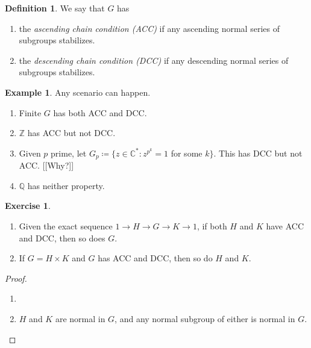 \documentclass[10pt,letterpaper,cm]{nupset}
\theoremstyle{definition}
\newtheorem*{definition}{Definition}
\newtheorem{exmp}{Example}
\newtheorem{exercise}{Exercise}
\newcommand{\C}{\mathbb C}
\newcommand{\Q}{\mathbb Q}
\newcommand{\Z}{\mathbb Z}
\newcommand{\1}{\mathbf{1}}
\newcommand{\0}{\vec 0}
\begin{document}
\begin{definition} We say that $G$ has
\begin{enumerate}
\item the \textit{ascending chain condition (ACC)} if any ascending normal series of subgroups stabilizes.
\item the \textit{descending chain condition (DCC)} if any descending normal series of subgroups stabilizes.
\end{enumerate}
\end{definition}

\begin{exmp} Any scenario can happen.
\begin{enumerate}
\item Finite $G$ has both ACC and DCC.
\item $\Z$ has ACC but not DCC.
\item Given $p$ prime, let $G_p \coloneqq  \{z\in \C^{\ast} : z^{p^k} =1$ for some $k \}$. This has DCC but not ACC. {[[Why?]]}
\item $\Q$ has neither property.
\end{enumerate}
\end{exmp}

\begin{exercise} $ $
\begin{enumerate}
\item Given the exact sequence $1 \to H \to G \to K \to 1$, if both $H$ and $K$ have ACC and DCC, then so does $G$. 
\item If $G = H \times K$ and $G$ has ACC and DCC, then so do $H$ and $K$.
\end{enumerate}
\begin{proof} $ $ 
\begin{enumerate}
\item 
\item $H$ and $K$ are normal in $G$, and any normal subgroup of either is normal in $G$.
\end{enumerate}
\end{proof}
\end{exercise}
\end{document}
